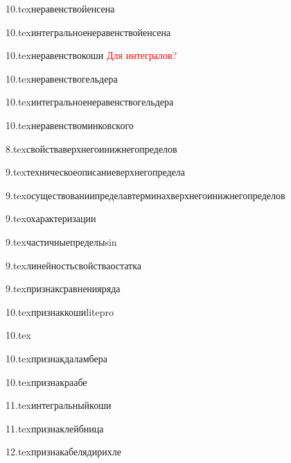 {10.tex}{неравенствойенсена}

{10.tex}{интегральноенеравенствойенсена}

{10.tex}{неравенствокоши}
\textcolor{red}{Для интегралов?}

{10.tex}{неравенствогельдера}

{10.tex}{интегральноенеравенствогельдера}

{10.tex}{неравенствоминковского}

{8.tex}{свойстваверхнегоинижнегопределов}

{9.tex}{техническоеописаниеверхнегопредела}

{9.tex}{осуществованиипределавтерминахверхнегоинижнегопределов}

{9.tex}{охарактеризации}

{9.tex}{частичныепределыsin}

{9.tex}{линейностьсвойстваостатка}

{9.tex}{признаксравненияряда}

{10.tex}{признаккошиlitepro}
\label{признаккошиpro}

{10.tex}{}

{10.tex}{признакдаламбера}

{10.tex}{признакраабе}

{11.tex}{интегральныйкоши}

{11.tex}{признаклейбница}

{12.tex}{признакабелядирихле}

